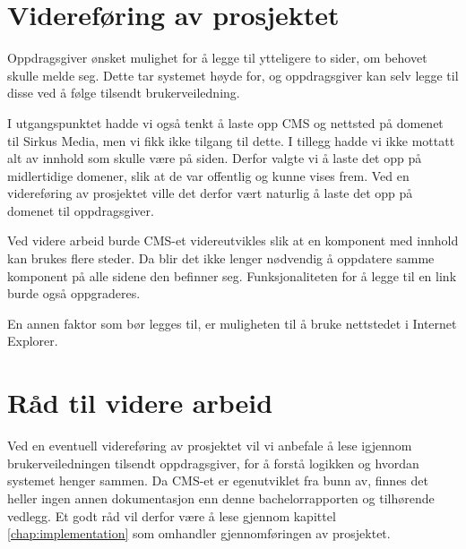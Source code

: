 \section{Videreføring av prosjektet}
Oppdragsgiver ønsket mulighet for å legge til ytteligere to sider, om behovet skulle melde seg. Dette tar systemet høyde for, og oppdragsgiver kan selv legge til disse ved å følge tilsendt brukerveiledning.

I utgangspunktet hadde vi også tenkt å laste opp CMS og nettsted på domenet til Sirkus Media, men vi fikk ikke tilgang til dette. I tillegg hadde vi ikke mottatt alt av innhold som skulle være på siden. Derfor valgte vi å laste det opp på midlertidige domener, slik at de var offentlig og kunne vises frem. Ved en videreføring av prosjektet ville det derfor vært naturlig å laste det opp på domenet til oppdragsgiver.

Ved videre arbeid burde CMS-et videreutvikles slik at en komponent med innhold kan brukes flere steder. Da blir det ikke lenger nødvendig å oppdatere samme komponent på alle sidene den befinner seg. Funksjonaliteten for å legge til en link burde også oppgraderes.

En annen faktor som bør legges til, er muligheten til å bruke nettstedet i Internet Explorer.

\section{Råd til videre arbeid}
Ved en eventuell videreføring av prosjektet vil vi anbefale å lese igjennom brukerveiledningen tilsendt oppdragsgiver, for å forstå logikken og hvordan systemet henger sammen. Da CMS-et er egenutviklet fra bunn av, finnes det heller ingen annen dokumentasjon enn denne bachelorrapporten og tilhørende vedlegg. Et godt råd vil derfor være å lese gjennom kapittel \ref{chap:implementation} som omhandler gjennomføringen av prosjektet.




